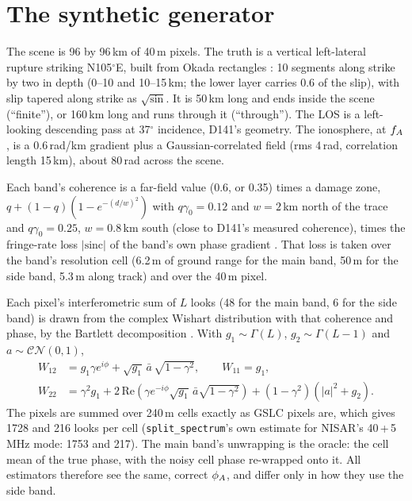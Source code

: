 \section{The synthetic generator}
\label{app:synthetic}
The scene is 96 by 96\,km of 40\,m pixels. The truth is a vertical left-lateral rupture striking N105$^\circ$E,
built from Okada rectangles \citep{okada1985surface}: 10 segments along strike by two in depth (0--10 and 10--15\,km;
the lower layer carries 0.6 of the slip), with slip tapered along strike as $\sqrt{\sin}$. It is 50\,km long and ends
inside the scene (``finite''), or 160\,km long and runs through it (``through''). The LOS is a left-looking
descending pass at 37$^\circ$ incidence, D141's geometry. The ionosphere, at $f_A$, is a 0.6\,rad/km gradient plus a
Gaussian-correlated field (rms 4\,rad, correlation length 15\,km), about 80\,rad across the scene.

Each band's coherence is a far-field value (0.6, or 0.35) times a damage zone, $q + (1-q)(1-e^{-(d/w)^2})$ with
$q\gamma_0 = 0.12$ and $w=2$\,km north of the trace and $q\gamma_0=0.25$, $w=0.8$\,km south (close to D141's
measured coherence), times the fringe-rate loss $|\mathrm{sinc}|$ of the band's own phase gradient \citep{zebker1992decorrelation}. That loss is
taken over the band's resolution cell (6.2\,m of ground range for the main band, 50\,m for the side band, 5.3\,m
along track) and over the 40\,m pixel.

Each pixel's interferometric sum of $L$ looks (48 for the main band, 6 for the side band) is drawn from the complex
Wishart distribution with that coherence and phase, by the Bartlett decomposition \citep{lee1994intensity}. With
$g_1\sim\Gamma(L)$, $g_2\sim\Gamma(L-1)$ and $a\sim\mathcal{CN}(0,1)$,
\begin{equation}
  \begin{aligned}
  W_{12} &= g_1\gamma e^{i\phi} + \sqrt{g_1}\,\bar a\,\sqrt{1-\gamma^2}, \qquad W_{11} = g_1,\\
  W_{22} &= \gamma^2 g_1 + 2\,\mathrm{Re}\!\left(\gamma e^{-i\phi}\sqrt{g_1}\,\bar a\sqrt{1-\gamma^2}\right)
  + (1-\gamma^2)(|a|^2+g_2).
  \end{aligned}
\end{equation}
The pixels are summed over 240\,m cells exactly as GSLC pixels are, which gives 1728 and 216 looks per cell
(\texttt{split\_spectrum}'s own estimate for NISAR's 40\,+\,5\,MHz mode: 1753 and 217). The main band's unwrapping is
the oracle: the cell mean of the true phase, with the noisy cell phase re-wrapped onto it. All estimators therefore
see the same, correct $\phi_A$, and differ only in how they use the side band.
